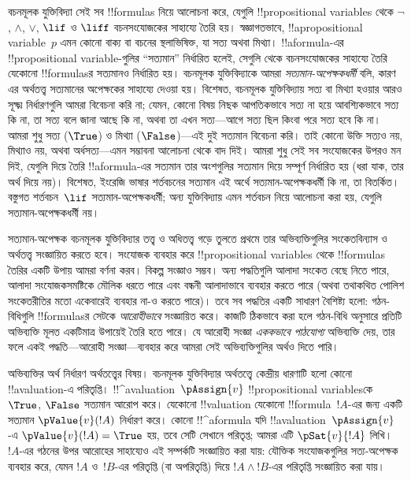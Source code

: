\documentclass[../../../include/open-logic-section]{subfiles}
\begin{document}


বচনমূলক যুক্তিবিদ্যা সেই সব !!{formula}s নিয়ে আলোচনা করে, যেগুলি
!!{propositional variable}s থেকে $\lnot$, $\land$, $\lor$, $\lif$ ও
$\liff$ বচনসংযোজকের সাহায্যে তৈরি হয়। স্বজ্ঞাগতভাবে,
!!a{propositional variable}~$p$ এমন কোনো বাক্য বা বচনের স্থলাভিষিক্ত,
যা সত্য অথবা মিথ্যা। !!a{formula}-এর !!{propositional variable}-গুলির
“সত্যমান” নির্ধারিত হলেই, সেগুলি থেকে বচনসংযোজকের সাহায্যে তৈরি যেকোনো
!!{formula}sর সত্যমানও নির্ধারিত হয়। বচনমূলক যুক্তিবিদ্যাকে আমরা
\emph{সত্যমান-অপেক্ষকধর্মী} বলি, কারণ এর অর্থতত্ত্ব সত্যমানের অপেক্ষকের
সাহায্যে দেওয়া হয়। বিশেষত, বচনমূলক যুক্তিবিদ্যায় সত্য বা মিথ্যা হওয়ার
আরও সূক্ষ্ম নির্ধারণগুলি আমরা বিবেচনা করি না; যেমন, কোনো বিষয় নিছক আপতিকভাবে
সত্য না হয়ে আবশ্যিকভাবে সত্য কি না, তা সত্য বলে জানা আছে কি না, অথবা তা এখন
সত্য—আগে সত্য ছিল কিংবা পরে সত্য হবে কি না। আমরা শুধু সত্য ($\True$) ও
মিথ্যা ($\False$)—এই দুই সত্যমান বিবেচনা করি। তাই কোনো উক্তি সত্যও নয়,
মিথ্যাও নয়, অথবা অর্ধসত্য—এমন সম্ভাবনা আলোচনা থেকে বাদ দিই। আমরা শুধু সেই
সব সংযোজকের উপরও মন দিই, যেগুলি দিয়ে তৈরি !!a{formula}-এর সত্যমান তার
অংশগুলির সত্যমান দিয়ে সম্পূর্ণ নির্ধারিত হয় (ধরা যাক, তার অর্থ দিয়ে নয়)।
বিশেষত, ইংরেজি ভাষার শর্তবচনের সত্যমান এই অর্থে সত্যমান-অপেক্ষকধর্মী কি না,
তা বিতর্কিত। বস্তুগত শর্তবচন~$\lif$ সত্যমান-অপেক্ষকধর্মী; অন্য যুক্তিবিদ্যায়
এমন শর্তবচন নিয়ে আলোচনা করা হয়, যেগুলি সত্যমান-অপেক্ষকধর্মী নয়।

সত্যমান-অপেক্ষক বচনমূলক যুক্তিবিদ্যার তত্ত্ব ও অধিতত্ত্ব গড়ে তুলতে প্রথমে
তার অভিব্যক্তিগুলির সংকেতবিন্যাস ও অর্থতত্ত্ব সংজ্ঞায়িত করতে হবে।
সংযোজক ব্যবহার করে !!{propositional variable}s থেকে !!{formula}s তৈরির
একটি উপায় আমরা বর্ণনা করব। বিকল্প সংজ্ঞাও সম্ভব। অন্য পদ্ধতিগুলি আলাদা
সংকেত বেছে নিতে পারে, আলাদা সংযোজকসমষ্টিকে মৌলিক ধরতে পারে এবং বন্ধনী
আলাদাভাবে ব্যবহার করতে পারে (অথবা তথাকথিত পোলিশ সংকেতরীতির মতো একেবারেই
ব্যবহার না-ও করতে পারে)। তবে সব পদ্ধতির একটি সাধারণ বৈশিষ্ট্য হলো:
গঠন-বিধিগুলি !!{formula}sর সেটকে \emph{আরোহীভাবে} সংজ্ঞায়িত করে।
কাজটি ঠিকভাবে করা হলে গঠন-বিধি অনুসারে প্রতিটি অভিব্যক্তি মূলত একটিমাত্র
উপায়েই তৈরি হতে পারে। যে আরোহী সংজ্ঞা \emph{এককভাবে পাঠযোগ্য}
অভিব্যক্তি দেয়, তার ফলে একই পদ্ধতি—আরোহী সংজ্ঞা—ব্যবহার করে আমরা সেই
অভিব্যক্তিগুলির অর্থও দিতে পারি।

অভিব্যক্তির অর্থ নির্ধারণ অর্থতত্ত্বের বিষয়। বচনমূলক যুক্তিবিদ্যার
অর্থতত্ত্বে কেন্দ্রীয় ধারণাটি হলো কোনো !!a{valuation}-এ পরিতৃপ্তি।
!!^a{valuation}~$\pAssign{v}$ !!{propositional variable}sকে
$\True$, $\False$ সত্যমান আরোপ করে। যেকোনো !!{valuation} যেকোনো
!!{formula}~$!A$-এর জন্য একটি সত্যমান $\pValue{v}(!A)$ নির্ধারণ করে।
কোনো !!^a{formula} যদি !!a{valuation}~$\pAssign{v}$-এ
$\pValue{v}(!A) = \True$ হয়, তবে সেটি সেখানে পরিতৃপ্ত; আমরা এটি
$\pSat{v}{!A}$ লিখি। $!A$-এর গঠনের উপর আরোহের সাহায্যেও এই সম্পর্কটি
সংজ্ঞায়িত করা যায়: যৌক্তিক সংযোজকগুলির সত্য-অপেক্ষক ব্যবহার করে, যেমন
$!A$ ও~$!B$-এর পরিতৃপ্তি (বা অপরিতৃপ্তি) দিয়ে $!A \land !B$-এর
পরিতৃপ্তি সংজ্ঞায়িত করা যায়।
\end{document}
